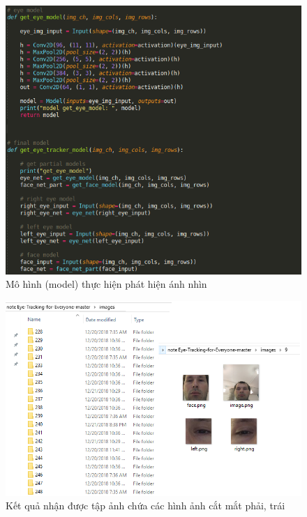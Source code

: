  \begin{center}
    \begin{figure}[h!]
    \begin{center}
     \includegraphics[scale=0.5]{img/mohindetect.png}
    \end{center}
    \caption{Mô hình (model) thực hiện phát hiện ánh nhìn}
    \label{refhinh20}
    \end{figure}
\end{center}

 \begin{center}
    \begin{figure}[h!]
    \begin{center}
     \includegraphics[scale=0.6]{img/5fileanhchupoutputthumuc1.png}
    \end{center}
    \caption{Kết quả nhận được tập ảnh chứa các hình ảnh cắt mắt phải, trái}
    \label{refhinh20}
    \end{figure}
\end{center}

